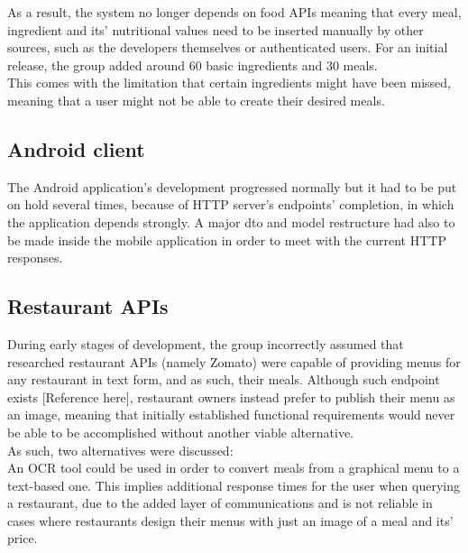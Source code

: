     As a result, the system no longer depends on food APIs meaning that every meal, ingredient and its' nutritional values
    need to be inserted manually by other sources, such as the developers themselves or authenticated users.
    For an initial release, the group added around 60 basic ingredients and 30 meals.\\
    
    This comes with the limitation that certain ingredients might have been missed,
    meaning that a user might not be able to create their desired meals.

    \subsection{Android client}

    The Android application's development progressed normally but it had to be put on hold several times, because of HTTP server's endpoints' completion, in which the application
    depends strongly. A major dto and model restructure had also to be made inside the mobile application in order to meet with the current HTTP responses.\\

    \subsection{Restaurant APIs}

    During early stages of development, 
    the group incorrectly assumed that researched restaurant APIs (namely Zomato) were capable 
    of providing menus for any restaurant in text form, and as such, their meals. Although such endpoint exists [Reference here], 
    restaurant owners instead prefer to publish their menu as an image, 
    meaning that initially established functional requirements would never be able to be accomplished without 
    another viable alternative.\\

    As such, two alternatives were discussed:\\

    An OCR tool could be used in order to convert meals from a graphical menu to a text-based one.
    This implies additional response times for the user when querying a restaurant, due to the added layer 
    of communications and is not reliable in cases where restaurants
    design their menus with just an image of a meal and its' price.

